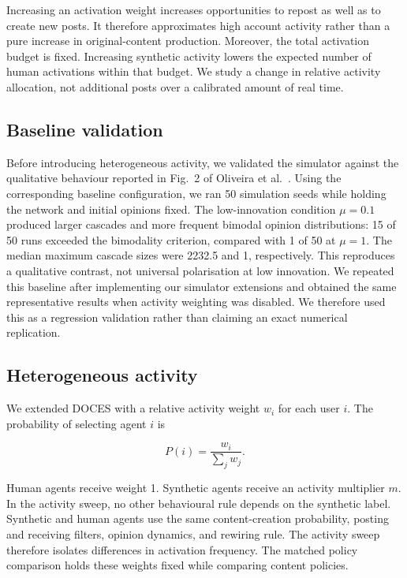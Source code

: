 \documentclass[runningheads]{llncs}
\begin{document}
Increasing an activation weight increases opportunities to repost as well as to create new posts. It therefore approximates high account activity rather than a pure increase in original-content production. Moreover, the total activation budget is fixed. Increasing synthetic activity lowers the expected number of human activations within that budget. We study a change in relative activity allocation, not additional posts over a calibrated amount of real time.

\subsection{Baseline validation}

Before introducing heterogeneous activity, we validated the simulator against the qualitative behaviour reported in Fig.~2 of Oliveira et al.~\cite{oliveira2026}. Using the corresponding baseline configuration, we ran 50 simulation seeds while holding the network and initial opinions fixed. The low-innovation condition \(\mu=0.1\) produced larger cascades and more frequent bimodal opinion distributions: 15 of 50 runs exceeded the bimodality criterion, compared with 1 of 50 at \(\mu=1\). The median maximum cascade sizes were 2232.5 and 1, respectively. This reproduces a qualitative contrast, not universal polarisation at low innovation. We repeated this baseline after implementing our simulator extensions and obtained the same representative results when activity weighting was disabled. We therefore used this as a regression validation rather than claiming an exact numerical replication.

\subsection{Heterogeneous activity}
We extended DOCES with a relative activity weight \(w_i\) for each user \(i\). The probability of selecting agent \(i\) is

\[
P(i)=\frac{w_i}{\sum_j w_j}.
\]

Human agents receive weight 1. Synthetic agents receive an activity multiplier \(m\). In the activity sweep, no other behavioural rule depends on the synthetic label. Synthetic and human agents use the same content-creation probability, posting and receiving filters, opinion dynamics, and rewiring rule. The activity sweep therefore isolates differences in activation frequency. The matched policy comparison holds these weights fixed while comparing content policies.
\end{document}

